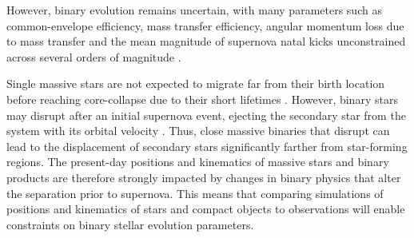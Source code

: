 \documentclass[twocolumn, twocolappendix, oneside]{aastex631}
\begin{document}
However, binary evolution remains uncertain, with many parameters such as common-envelope efficiency, mass transfer efficiency, angular momentum loss due to mass transfer and the mean magnitude of supernova natal kicks unconstrained across several orders of magnitude \citep[e.g.,][]{Janka+2012:2012ARNPS..62..407J,Ivanova+2013, Katsuda+2018,Ivanova+2020:2020cee..book.....I,Ropke+2023:2023LRCA....9....2R, Marchant2023}.

Single massive stars are not expected to migrate far from their birth location before reaching core-collapse due to their short lifetimes \citep[$\lesssim50$\,Myr, e.g., ][]{zapartas:17}. However, binary stars may disrupt after an initial supernova event, ejecting the secondary star from the system with its orbital velocity \citep[e.g.,][]{Blaauw+1961,Eldridge+2011:2011MNRAS.414.3501E,Renzo+2019:2019A&A...624A..66R}. Thus, close massive binaries that disrupt can lead to the displacement of secondary stars significantly farther from star-forming regions. The present-day positions and kinematics of massive stars and binary products are therefore strongly impacted by changes in binary physics that alter the separation prior to supernova. This means that comparing simulations of positions and kinematics of stars and compact objects to observations will enable constraints on binary stellar evolution parameters.
\end{document}
